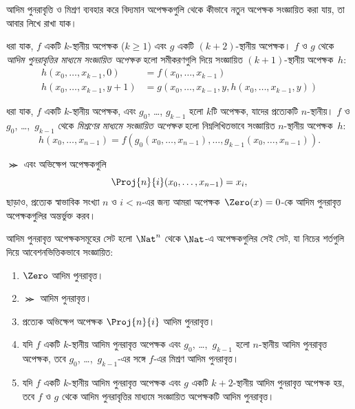 \documentclass[../../../include/open-logic-section]{subfiles}
\begin{document}

আদিম পুনরাবৃত্তি ও মিশ্রণ ব্যবহার করে বিদ্যমান অপেক্ষকগুলি থেকে কীভাবে
নতুন অপেক্ষক সংজ্ঞায়িত করা যায়, তা আবার লিখে রাখা যাক।

\begin{defn}
   ধরা যাক, $f$ একটি $k$-স্থানীয়
  অপেক্ষক ($k\ge 1$) এবং $g$ একটি $(k+2)$-স্থানীয় অপেক্ষক। $f$ ও
  $g$ থেকে \emph{আদিম পুনরাবৃত্তির মাধ্যমে সংজ্ঞায়িত অপেক্ষক} হলো
  সমীকরণগুলি দিয়ে সংজ্ঞায়িত $(k+1)$-স্থানীয় অপেক্ষক~$h$:
  \begin{align*}
    h(x_0,\dots,x_{k-1},0) & =  f(x_0,\dots,x_{k-1}) \\
    h(x_0,\dots,x_{k-1},y+1) & = g(x_0,\dots,x_{k-1}, y, h(x_0,\dots,x_{k-1}, y))
  \end{align*}
\end{defn}

\begin{defn}
   ধরা যাক, $f$ একটি $k$-স্থানীয় অপেক্ষক,
  এবং $g_0$, \dots, $g_{k-1}$ হলো $k$টি অপেক্ষক, যাদের প্রত্যেকটি
  $n$-স্থানীয়। $f$ ও $g_0$, \dots,~$g_{k-1}$ থেকে \emph{মিশ্রণের
  মাধ্যমে সংজ্ঞায়িত অপেক্ষক} হলো নিম্নলিখিতভাবে সংজ্ঞায়িত
  $n$-স্থানীয় অপেক্ষক~$h$:
  \[
  h(x_0, \dots, x_{n-1}) =
  f(g_0(x_0, \dots, x_{n-1}), \dots, g_{k-1}(x_0, \dots, x_{n-1})).
  \]
\end{defn}

$\Succ$ এবং অভিক্ষেপ অপেক্ষকগুলি
\[
\Proj{n}{i}(x_0,\dots,x_{n-1}) = x_i,
\]
ছাড়াও, প্রত্যেক স্বাভাবিক সংখ্যা $n$ ও $i < n$-এর জন্য আমরা
অপেক্ষক~$\Zero(x) = 0$-কে আদিম পুনরাবৃত্ত অপেক্ষকগুলির অন্তর্ভুক্ত করব।

\begin{defn}
  আদিম পুনরাবৃত্ত অপেক্ষকসমূহের সেট হলো $\Nat^n$ থেকে $\Nat$-এ
  অপেক্ষকগুলির সেই সেট, যা নিচের শর্তগুলি দিয়ে আবেশনভিত্তিকভাবে
  সংজ্ঞায়িত:
  \begin{enumerate}
  \item $\Zero$ আদিম পুনরাবৃত্ত।
  \item $\Succ$ আদিম পুনরাবৃত্ত।
  \item প্রত্যেক অভিক্ষেপ অপেক্ষক $\Proj{n}{i}$ আদিম পুনরাবৃত্ত।
  \item যদি $f$ একটি $k$-স্থানীয় আদিম পুনরাবৃত্ত অপেক্ষক এবং $g_0$,
    \dots,~$g_{k-1}$ হলো $n$-স্থানীয় আদিম পুনরাবৃত্ত অপেক্ষক, তবে
    $g_0$, \dots,~$g_{k-1}$-এর সঙ্গে $f$-এর মিশ্রণ আদিম পুনরাবৃত্ত।
  \item যদি $f$ একটি $k$-স্থানীয় আদিম পুনরাবৃত্ত অপেক্ষক এবং $g$ একটি
    $k+2$-স্থানীয় আদিম পুনরাবৃত্ত অপেক্ষক হয়, তবে $f$ ও $g$ থেকে
    আদিম পুনরাবৃত্তির মাধ্যমে সংজ্ঞায়িত অপেক্ষকটি আদিম পুনরাবৃত্ত।
\end{enumerate}
\end{defn}
\end{document}

